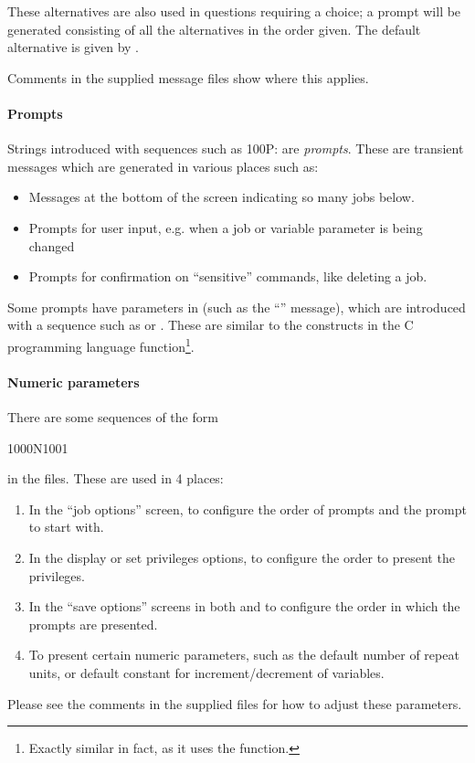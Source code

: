 These alternatives are also used in questions requiring a choice; a prompt will be generated consisting of all the alternatives in the
order given. The default alternative is given by .

Comments in the supplied message files show where this applies.

\paragraph{Prompts}
Strings introduced with sequences such as 100P: are \textit{prompts}. These are transient messages which are generated in various places such
as:

\begin{itemize}
\item Messages at the bottom of the screen indicating so many jobs below.
\item Prompts for user input, e.g. when a job or variable parameter is being changed
\item Prompts for confirmation on ``sensitive'' commands, like deleting a job.
\end{itemize}
Some prompts have parameters in (such as the ``'' message), which are introduced with a \exampletext{\%}
sequence such as  or . These are similar to the constructs in the C programming language 
function\footnote{Exactly similar in fact, as it uses the  function.}.

\paragraph{Numeric parameters}
There are some sequences of the form

\begin{expara}

1000N1001

\end{expara}

in the files. These are used in 4 places:

\begin{enumerate}
\item In the \PrBtq{} ``job options'' screen, to configure the order of prompts and the prompt to start with.
\item In the \PrBtuser{} display or set privileges options, to configure the order to present the privileges.
\item In the ``save options'' screens in both \PrBtq{} and \PrBtuser{} to configure the order in which the prompts are presented.
\item To present certain numeric parameters, such as the default number of repeat units, or default constant for increment/decrement of
variables.
\end{enumerate}
Please see the comments in the supplied files for how to adjust these parameters.

